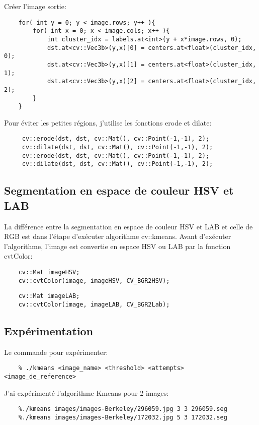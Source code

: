 \documentclass[article=a4, fontsize=11pt]{scrartcl}	%
\begin{document}
Créer l'image sortie:
\begin{lstlisting}
    for( int y = 0; y < image.rows; y++ ){
        for( int x = 0; x < image.cols; x++ ){ 
            int cluster_idx = labels.at<int>(y + x*image.rows, 0);
            dst.at<cv::Vec3b>(y,x)[0] = centers.at<float>(cluster_idx, 0);
            dst.at<cv::Vec3b>(y,x)[1] = centers.at<float>(cluster_idx, 1);
            dst.at<cv::Vec3b>(y,x)[2] = centers.at<float>(cluster_idx, 2);
        }                       
    }  
\end{lstlisting}
Pour éviter les petites régions, j'utilise les fonctions erode et dilate:
\begin{lstlisting}
     cv::erode(dst, dst, cv::Mat(), cv::Point(-1,-1), 2);                                                                                                       
     cv::dilate(dst, dst, cv::Mat(), cv::Point(-1,-1), 2);
     cv::erode(dst, dst, cv::Mat(), cv::Point(-1,-1), 2);
     cv::dilate(dst, dst, cv::Mat(), cv::Point(-1,-1), 2);   
\end{lstlisting}
\subsection{Segmentation en espace de couleur HSV et LAB}
La différence entre la segmentation en espace de couleur HSV et LAB et celle de RGB est dans l'étape d'exécuter algorithme cv::kmeans. Avant d'exécuter l'algorithme, l'image est convertie en espace HSV ou LAB par la fonction cvtColor:
\begin{lstlisting}
    cv::Mat imageHSV;
    cv::cvtColor(image, imageHSV, CV_BGR2HSV);
\end{lstlisting}

\begin{lstlisting}
    cv::Mat imageLAB;
    cv::cvtColor(image, imageLAB, CV_BGR2Lab);
\end{lstlisting}
\subsection{Expérimentation}
Le commande pour expérimenter:
\begin{lstlisting}
    % ./kmeans <image_name> <threshold> <attempts> <image_de_reference>
\end{lstlisting}
J'ai expérimenté l'algorithme Kmeans pour 2 images:
\begin{lstlisting}
	%./kmeans images/images-Berkeley/296059.jpg 3 3 296059.seg
	%./kmeans images/images-Berkeley/172032.jpg 5 3 172032.seg
\end{lstlisting}
\end{document}
